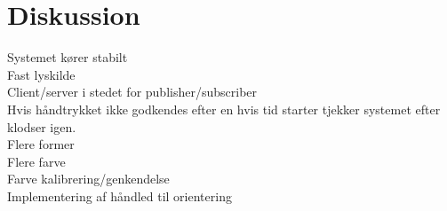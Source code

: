 \chapter{Diskussion}\label{chap:Diskussion}
Systemet kører stabilt\\
Fast lyskilde\\
Client/server i stedet for publisher/subscriber\\
Hvis håndtrykket ikke godkendes efter en hvis tid starter tjekker systemet efter klodser igen.\\ 
Flere former\\
Flere farve\\
Farve kalibrering/genkendelse\\
Implementering af håndled til orientering\\